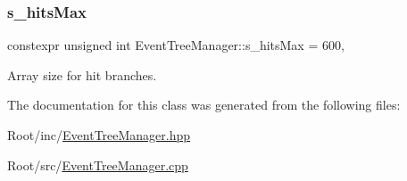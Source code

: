 \subsubsection{\texorpdfstring{s\+\_\+hits\+Max}{s\_hitsMax}}
{\footnotesize\ttfamily constexpr unsigned int Event\+Tree\+Manager\+::s\+\_\+hits\+Max = 600\hspace{0.3cm}{\ttfamily [static]}, {\ttfamily [private]}}



Array size for hit branches. 



The documentation for this class was generated from the following files\+:\begin{DoxyCompactItemize}
\item 
Root/inc/\hyperlink{_event_tree_manager_8hpp}{Event\+Tree\+Manager.\+hpp}\item 
Root/src/\hyperlink{_event_tree_manager_8cpp}{Event\+Tree\+Manager.\+cpp}\end{DoxyCompactItemize}
